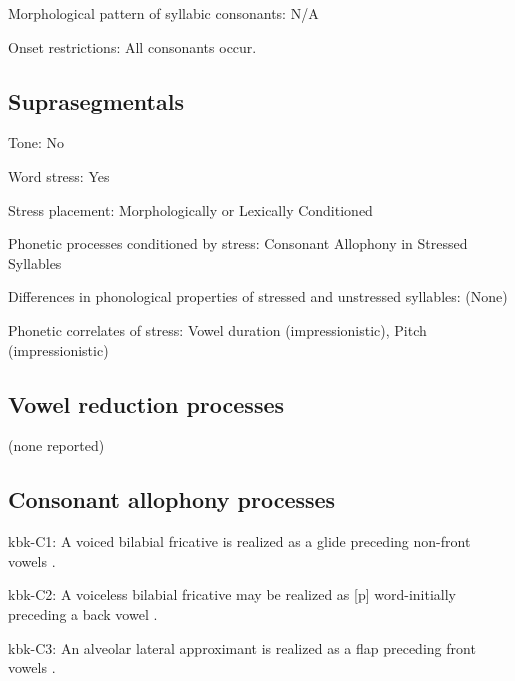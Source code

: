 {\begin{appendixdesc}
\item[Morphological pattern of syllabic consonants:] N/A

\item[Onset restrictions:] All consonants occur.
\end{appendixdesc}
\subsection*{Suprasegmentals}
\begin{appendixdesc}
\item[Tone:] No

\item[Word stress:] Yes

\item[Stress placement:] Morphologically or Lexically Conditioned

\item[Phonetic processes conditioned by stress:] Consonant Allophony in Stressed Syllables

\item[Differences in phonological properties of stressed and unstressed syllables:] (None) 

\item[Phonetic correlates of stress:] Vowel duration (impressionistic), Pitch (impressionistic)
\end{appendixdesc}
\subsection*{Vowel reduction processes}

(none reported)
\subsection*{Consonant allophony processes}
\begin{appendixdesc}

\item[kbk-C1:] A voiced bilabial fricative is realized as a glide preceding non-front vowels \citep{Dutton1996}.

\item[kbk-C2:] A voiceless bilabial fricative may be realized as [p] word-initially preceding a back vowel \citep{Dutton1996}.

\item[kbk-C3:] An alveolar lateral approximant is realized as a flap preceding front vowels \citep{Dutton1996}.
\end{appendixdesc}
}
